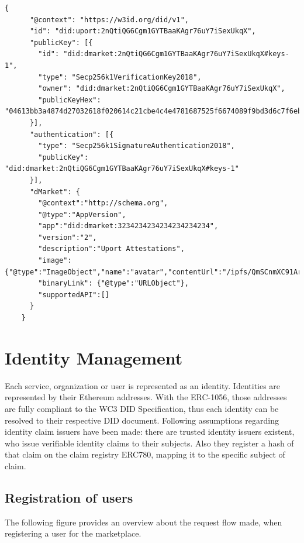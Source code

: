 \begin{lstlisting}[caption={AppVersion}, language=Solidity, label=lst:appVersionFormat, numbers=none]
    {
      "@context": "https://w3id.org/did/v1",
      "id": "did:uport:2nQtiQG6Cgm1GYTBaaKAgr76uY7iSexUkqX",
      "publicKey": [{
        "id": "did:dmarket:2nQtiQG6Cgm1GYTBaaKAgr76uY7iSexUkqX#keys-1",
        "type": "Secp256k1VerificationKey2018",
        "owner": "did:dmarket:2nQtiQG6Cgm1GYTBaaKAgr76uY7iSexUkqX",
        "publicKeyHex": "04613bb3a4874d27032618f020614c21cbe4c4e4781687525f6674089f9bd3d6c7f6eb13569053d31715a3ba32e0b791b97922af6387f087d6b5548c06944ab062"
      }],
      "authentication": [{
        "type": "Secp256k1SignatureAuthentication2018",
        "publicKey": "did:dmarket:2nQtiQG6Cgm1GYTBaaKAgr76uY7iSexUkqX#keys-1"
      }],
      "dMarket": {
        "@context":"http://schema.org",
        "@type":"AppVersion",
        "app":"did:dmarket:3234234234234234234234",
        "version":"2", 
        "description":"Uport Attestations",
        "image":{"@type":"ImageObject","name":"avatar","contentUrl":"/ipfs/QmSCnmXC91Arz2gj934Ce4DeR7d9fULWRepjzGMX6SSazB"}
        "binaryLink": {"@type":"URLObject"},
        "supportedAPI":[]
      }
    }
\end{lstlisting}


\section{Identity Management}

Each service, organization or user is represented as an identity. Identities are represented by their Ethereum addresses. With the ERC-1056, those addresses are fully compliant to the WC3 DID Specification, thus each identity can be resolved to their respective DID document. 
Following assumptions regarding identity claim issuers have been made: there are trusted identity issuers existent, who issue verifiable identity claims to their subjects. Also they register a hash of that claim on the claim registry ERC780, mapping it to the specific subject of claim. 

\subsection{Registration of users}

The following figure provides an overview about the request flow made, when registering a user for the marketplace. 

